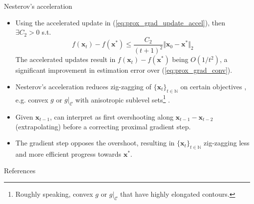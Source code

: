 \documentclass{beamer}
\numberwithin{equation}{section}
\newcommand{\aref}[1]{\alert{\ref{#1}}}
\begin{document}
\begin{frame}{Nesterov's acceleration}
    \begin{itemize}
        \item
        Using the accelerated update in (\aref{eq:prox_grad_update_accel}),
        then $ \exists C_2 > 0 $ s.t. \cite{stat_learn_sparsity}
        \begin{equation} \label{eq:prox_grad_accel_conv}
            f(\mathbf{x}_t) - f(\mathbf{x}^*) \le \frac{C_2}{(t + 1)^2}
            \Vert\mathbf{x}_0 - \mathbf{x}^*\Vert_2
        \end{equation}
        The accelerated updates result in $ f(\mathbf{x}_t) - f(\mathbf{x}^*) $
        being $ O(1 / t^2) $, a significant improvement in estimation error
        over (\aref{eq:prox_grad_conv}).

        \item
        Nesterov's acceleration reduces zig-zagging of
        $ \{\mathbf{x}_t\}_{t \in \mathbb{N}} $ on certain objectives
        \cite{stat_learn_sparsity}, e.g. convex $ g $ or $ g|_\mathcal{C} $
        with anisotropic sublevel sets\footnote{
            Roughly speaking, convex $ g $ or $ g|_\mathcal{C} $ that have
            highly elongated contours.
        } \cite{bv_convex_opt}.

        \item
        Given $ \mathbf{x}_{t - 1} $, can interpret as first overshooting
        along $ \mathbf{x}_{t - 1} - \mathbf{x}_{t - 2} $ (extrapolating)
        before a correcting proximal gradient step.

        \item
        The gradient step opposes the overshoot, resulting in
        $ \{\mathbf{x}_t\}_{t \in \mathbb{N}} $ zig-zagging less and more
        efficient progress towards $ \mathbf{x}^* $.
    \end{itemize}

    \medskip
\end{frame}

\begin{frame}{References}
    
    
\end{frame}
\end{document}
